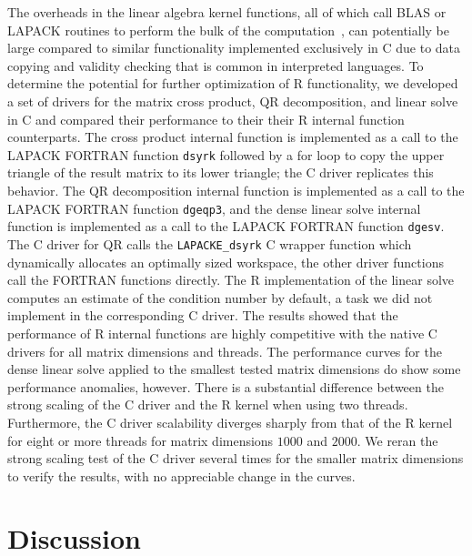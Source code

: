 The overheads in the linear algebra kernel functions, all of which call BLAS or LAPACK
routines to perform the bulk of the computation~\cite{cran:Rmanuals}, can potentially be
large compared to similar functionality implemented exclusively in C due to data copying
and validity checking that is common in interpreted languages. To determine the potential
for further optimization of R functionality, we developed a set of drivers for the matrix
cross product, QR decomposition, and linear solve in C and compared their performance to
their their R internal function counterparts. The cross product internal function is
implemented as a call to the LAPACK FORTRAN function \texttt{dsyrk} followed by a for loop
to copy the upper triangle of the result matrix to its lower triangle; the C driver
replicates this behavior. The QR decomposition internal function is implemented as a call
to the LAPACK FORTRAN function \texttt{dgeqp3}, and the dense linear solve internal
function is implemented as a call to the LAPACK FORTRAN function \texttt{dgesv}. The C
driver for QR calls the \texttt{LAPACKE\_dsyrk} C wrapper function which dynamically
allocates an optimally sized workspace, the other driver functions call the FORTRAN
functions directly. The R implementation of the linear solve computes an estimate of the
condition number by default, a task we did not implement in the corresponding C driver.
The results showed that the performance of R internal functions are highly competitive
with the native C drivers for all matrix dimensions and threads. The performance curves
for the dense linear solve applied to the smallest tested matrix dimensions do
show some performance anomalies, however. There is a substantial difference between the
strong scaling of the C driver and the R kernel when using two threads. Furthermore, the C
driver scalability diverges sharply from that of the R kernel for eight or more threads
for matrix dimensions $1000$ and $2000$. We reran the strong scaling test of the C driver
several times for the smaller matrix dimensions to verify the results, with no appreciable
change in the curves.


\section{Discussion} \label{sec:discuss}

